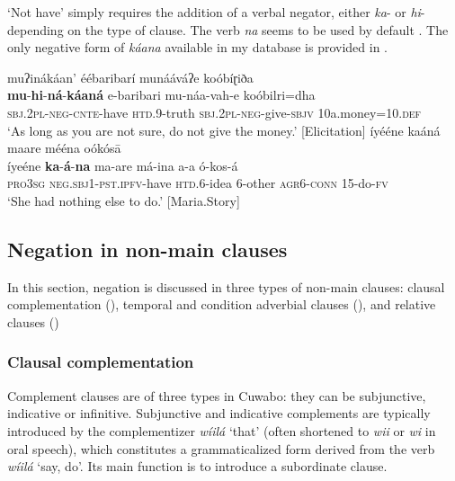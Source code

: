 \documentclass[output=paper,colorlinks=true, citecolor=brown,draftmode]{langscibook}
\begin{document}
‘Not have’ simply requires the addition of a verbal negator, either \textit{ka}{}- or \textit{hi}{}- depending on the type of clause. The verb \textit{na} seems to be used by default . The only negative form of \textit{káana} available in my database is provided in . 

{\ea\label{ex:cuw:34}
    \ea\label{ex:cuw:34a} muʔinákáan’ éébaribarí munááváʔe koóbíɽiða\\ 
        \gll   \textbf{mu}{}-\textbf{hi}{}-\textbf{ná}{}-\textbf{káaná} e-baribari mu-náa-vah-e koóbilri=dha  \\
              \textsc{sbj.2pl-neg-cnte}{}-have \textsc{htd.9}{}-truth \textsc{sbj.2pl-neg}{}-give-\textsc{sbjv} 10a.money=10.\textsc{def}  \\
        \glt  ‘As long as you are not sure, do not give the money.’ [Elicitation]
    \ex\label{ex:cuw:34b}   íyééne kaáná maare mééna oókósā\\ 
        \gll íyeéne \textbf{ka}{}-\textbf{á}{}-\textbf{na} ma-are má-ina a-a ó-kos-á \\ 
              \textsc{pro3sg} \textsc{neg.sbj1}-\textsc{pst.ipfv}{}-have \textsc{htd.6}{}-idea 6-other \textsc{agr}6-\textsc{conn} 15-do-\textsc{fv}  \\
        \glt  ‘She had nothing else to do.’ [Maria.Story]
    \z
\z}

\subsection{Negation in non-main clauses}\label{sec:cuw:2.4}
In this section, negation is discussed in three types of non-main clauses: clausal complementation (), temporal and condition adverbial clauses (), and relative clauses ()

\subsubsection{Clausal complementation}\label{sec:cuw:2.4.1}
Complement clauses are of three types in Cuwabo: they can be subjunctive, indicative or infinitive. Subjunctive and indicative complements are typically introduced by the complementizer \textit{wíilá} ‘that’ (often shortened to \textit{wii} or \textit{wi} in oral speech), which constitutes a grammaticalized form derived from the verb \textit{wíilá} ‘say, do’. Its main function is to introduce a subordinate clause. 
\end{document}
